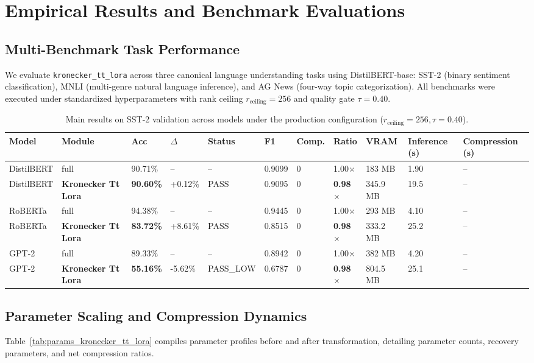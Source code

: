 \section{Empirical Results and Benchmark Evaluations}
\label{sec:results}

\subsection{Multi-Benchmark Task Performance}
We evaluate \texttt{kronecker\_tt\_lora} across three canonical language understanding tasks using DistilBERT-base: SST-2 (binary sentiment classification), MNLI (multi-genre natural language inference), and AG News (four-way topic categorization). All benchmarks were executed under standardized hyperparameters with rank ceiling $r_{\mathrm{ceiling}} = 256$ and quality gate $\tau = 0.40$.

\begin{table}[t]
\centering
\small
\begin{tabular}{lllllllllll}
\toprule
\textbf{Model} & \textbf{Module} & \textbf{Acc} & \textbf{$\Delta$} & \textbf{Status} & \textbf{F1} & \textbf{Comp.} & \textbf{Ratio} & \textbf{VRAM} & \textbf{Inference (s)} & \textbf{Compression (s)} \\
\midrule
DistilBERT & full & 90.71\% & -- & -- & 0.9099 & 0 & 1.00$\times$ & 183 MB & 1.90 & -- \\
DistilBERT & \textbf{Kronecker Tt Lora} & \textbf{90.60\%} & +0.12\% & PASS & 0.9095 & 0 & \textbf{0.98$\times$} & 345.9 MB & 19.5 & -- \\
RoBERTa & full & 94.38\% & -- & -- & 0.9445 & 0 & 1.00$\times$ & 293 MB & 4.10 & -- \\
RoBERTa & \textbf{Kronecker Tt Lora} & \textbf{83.72\%} & +8.61\% & PASS & 0.8515 & 0 & \textbf{0.98$\times$} & 333.2 MB & 25.2 & -- \\
GPT-2 & full & 89.33\% & -- & -- & 0.8942 & 0 & 1.00$\times$ & 382 MB & 4.20 & -- \\
GPT-2 & \textbf{Kronecker Tt Lora} & \textbf{55.16\%} & -5.62\% & PASS_LOW & 0.6787 & 0 & \textbf{0.98$\times$} & 804.5 MB & 25.1 & -- \\
\bottomrule
\end{tabular}
\caption{Main results on SST-2 validation across models under the production configuration ($r_{\mathrm{ceiling}}=256, \tau=0.40$).}
\label{tab:main_sst2}
\end{table}

\subsection{Parameter Scaling and Compression Dynamics}
Table~\ref{tab:params_kronecker_tt_lora} compiles parameter profiles before and after transformation, detailing parameter counts, recovery parameters, and net compression ratios.

